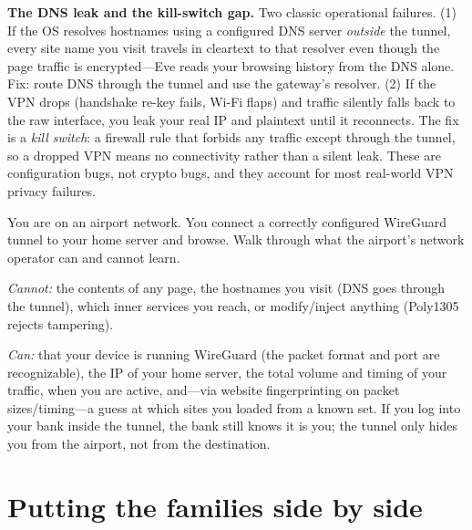 \begin{attackbox}
\textbf{The DNS leak and the kill-switch gap.} Two classic operational failures. (1) If the OS resolves hostnames using a configured DNS server \emph{outside} the tunnel, every site name you visit travels in cleartext to that resolver even though the page traffic is encrypted---Eve reads your browsing history from the DNS alone. Fix: route DNS through the tunnel and use the gateway's resolver. (2) If the VPN drops (handshake re-key fails, Wi-Fi flaps) and traffic silently falls back to the raw interface, you leak your real IP and plaintext until it reconnects. The fix is a \emph{kill switch}: a firewall rule that forbids any traffic except through the tunnel, so a dropped VPN means no connectivity rather than a silent leak. These are configuration bugs, not crypto bugs, and they account for most real-world VPN privacy failures.
\end{attackbox}

\begin{walkbox}
You are on an airport network. You connect a correctly configured WireGuard tunnel to your home server and browse. Walk through what the airport's network operator can and cannot learn.

\emph{Cannot:} the contents of any page, the hostnames you visit (DNS goes through the tunnel), which inner services you reach, or modify/inject anything (Poly1305 rejects tampering).

\emph{Can:} that your device is running WireGuard (the packet format and port are recognizable), the IP of your home server, the total volume and timing of your traffic, when you are active, and---via website fingerprinting on packet sizes/timing---a guess at which sites you loaded from a known set. If you log into your bank inside the tunnel, the bank still knows it is you; the tunnel only hides you from the airport, not from the destination.
\end{walkbox}

\section{Putting the families side by side}
\label{ch30:comparison}

